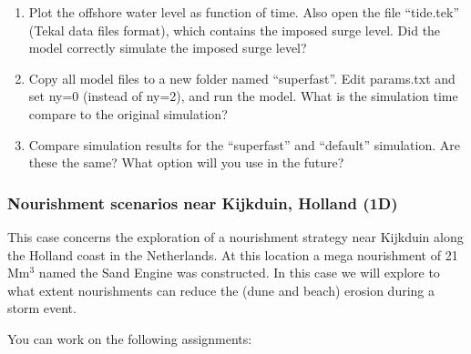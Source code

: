 \documentclass{article}
\begin{document}
\begin{enumerate}
\item  Plot the offshore water level as function of time. Also open the file ``tide.tek'' (Tekal data files format), which contains the imposed surge level. Did the model correctly simulate the imposed surge level?

\item  Copy all model files to a new folder named ``superfast''. Edit params.txt and set ny=0 (instead of ny=2), and run the model. What is the simulation time compare to the original simulation?

\item  Compare simulation results for the ``superfast'' and ``default'' simulation. Are these the same? What option will you use in the future?  
\end{enumerate}


\subsubsection{ Nourishment scenarios near Kijkduin, Holland (1D) }

\noindent This case concerns the exploration of a nourishment strategy near Kijkduin along the Holland coast in the Netherlands. At this location a mega nourishment of 21 Mm${}^{3}$ named the Sand Engine was constructed. In this case we will explore to what extent nourishments can reduce the (dune and beach) erosion during a storm event. 

\noindent 

\noindent You can work on the following assignments:

\noindent 
\end{document}
